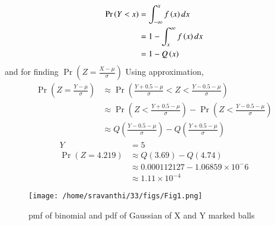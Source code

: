 \documentclass[journal,12pt,onecolumn]{IEEEtran}
\providecommand{\pr}[1]{\ensuremath{\Pr\left(#1\right)}}
\providecommand{\qfunc}[1]{\ensuremath{Q\left(#1\right)}}
\providecommand{\qfunc}[1]{\ensuremath{Q\left(#1\right)}}
\begin{document}
\begin{align}
	\pr{Y<x}&=\int_{-\infty}^x f\brak{x} dx\\
	&=1-\int_x^{\infty}f\brak{x}dx\\
	&=1-\qfunc{x}
\end{align}
and for finding \pr{Z=\frac{X-\mu}{\sigma}} Using approximation,
\begin{align}
	\pr{Z=\frac{Y-\mu}{\sigma}} &\approx \pr{\frac{Y+0.5-\mu}{\sigma} < Z < \frac{Y-0.5-\mu}{\sigma}}\\
	&\approx \pr{Z<\frac{Y+0.5-\mu}{\sigma}} - \pr{Z<\frac{Y-0.5-\mu}{\sigma}}\\
	&\approx \qfunc{\frac{Y-0.5-\mu}{\sigma}} - \qfunc{\frac{Y+0.5-\mu}{\sigma}}
\end{align}
\begin{align}
Y &= 5\\
\pr{Z=4.219} &\approx \qfunc{3.69} - \qfunc{4.74}\\
    &\approx 0.000112127 -  1.06859 \times  10^-6 \\
	      &\approx 1.11 \times 10^{-4}      
\end{align}
\begin{figure}
\texttt{[image: /home/sravanthi/33/figs/Fig1.png]}
\caption{pmf of binomial and pdf of Gaussian of X and Y marked balls}
\label{fig:gaussian/9/3/33/}
\end{figure}
\end{document}
